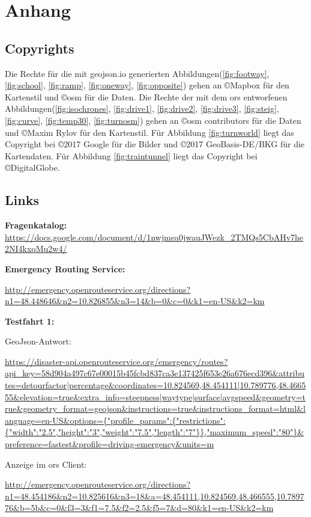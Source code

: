 \section{Anhang}
\label{sec:anhang}
\subsection*{Copyrights}
Die Rechte für die mit geojson.io generierten Abbildungen(\ref{fig:footway}, \ref{fig:school}, \ref{fig:ramp}, \ref{fig:oneway}, \ref{fig:opposite}) gehen an \copyright Mapbox für den Kartenstil und \copyright \gls{osm} für die Daten.
\newline Die Rechte der mit dem \gls{ors} entworfenen Abbildungen(\ref{fig:isochrones}, \ref{fig:drive1}, \ref{fig:drive2}, \ref{fig:drive3}, \ref{fig:steig}, \ref{fig:curve}, \ref{fig:temp30}, \ref{fig:turnosm}) gehen an \copyright \gls{osm} contributors für die Daten und \copyright Maxim Rylov für den Kartenstil.
Für Abbildung \ref{fig:turnworld} liegt das Copyright bei \copyright 2017 Google für die Bilder und \copyright 2017 GeoBasis-DE/BKG für die Kartendaten.
Für Abbildung \ref{fig:traintunnel} liegt das Copyright bei \copyright DigitalGlobe.

\subsection*{Links}
\textbf{Fragenkatalog:}
\sloppy
\url{https://docs.google.com/document/d/1nwjmea0jwauJWezk\_2TMQs5CbAHv7he2NI4kxqMu2w4/}
\medskip

\textbf{Emergency Routing Service:}

\url{http://emergency.openrouteservice.org/directions?n1=48.448646\&n2=10.826855\&n3=14\&b=0\&c=0\&k1=en-US\&k2=km}
\medskip

\textbf{Testfahrt 1:}

GeoJson-Antwort:\par
\url{https://disaster-api.openrouteservice.org/emergency/routes?api_key=58d904a497c67e00015b45fcbd837ca3e137425f653e26a676ecd396&attributes=detourfactor|percentage&coordinates=10.824569,48.454111|10.789776,48.466555&elevation=true&extra_info=steepness|waytype|surface|avgspeed&geometry=true&geometry_format=geojson&instructions=true&instructions_format=html&language=en-US&options={"profile_params":{"restrictions":{"width":"2.5","height":"3","weight":"7.5","length":"7"}},"maximum_speed":"80"}\&preference=fastest\&profile=driving-emergency\&units=m}
\medskip

Anzeige im \gls{ors} Client:\par
\url{http://emergency.openrouteservice.org/directions?n1=48.454186&n2=10.825616&n3=18&a=48.454111,10.824569,48.466555,10.789776&b=5b&c=0&f3=3&f1=7.5&f2=2.5&f5=7&d=80&k1=en-US&k2=km}
\medskip

